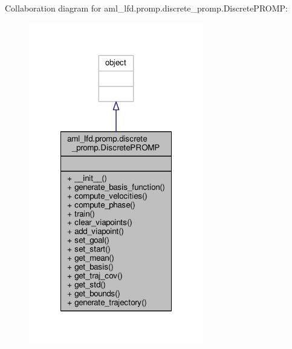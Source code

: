 Collaboration diagram for aml\-\_\-lfd.\-promp.\-discrete\-\_\-promp.\-Discrete\-P\-R\-O\-M\-P\-:
\nopagebreak
\begin{figure}[H]
\begin{center}
\leavevmode
\includegraphics[width=216pt]{classaml__lfd_1_1promp_1_1discrete__promp_1_1_discrete_p_r_o_m_p__coll__graph}
\end{center}
\end{figure}
